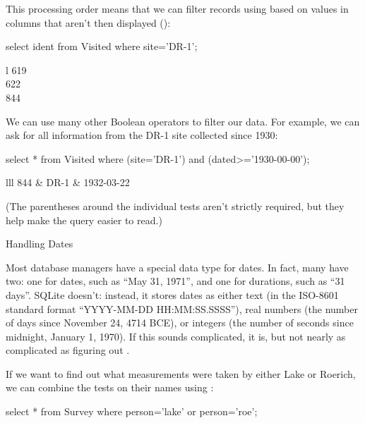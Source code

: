 This processing order means that we can filter records using
 based on values in columns that aren't then displayed
():

\begin{VerbIn}
select ident from Visited where site='DR-1';
\end{VerbIn}

\begin{sqltable}{l}
619 \\
622 \\
844 \\
\end{sqltable}


We can use many other Boolean operators to filter our data. For example,
we can ask for all information from the DR-1 site collected since 1930:

\begin{VerbIn}
select * from Visited where (site='DR-1') and (dated>='1930-00-00');
\end{VerbIn}

\begin{sqltable}{lll}
844 & DR-1 & 1932-03-22 \\
\end{sqltable}

(The parentheses around the individual tests aren't strictly required,
but they help make the query easier to read.)

\begin{swcbox}{Handling Dates}

Most database managers have a special data type for dates. In fact, many
have two: one for dates, such as ``May 31, 1971'', and one for
durations, such as ``31 days''. SQLite doesn't: instead, it stores dates
as either text (in the ISO-8601 standard format ``YYYY-MM-DD
HH:MM:SS.SSSS''), real numbers (the number of days since November 24,
4714 BCE), or integers (the number of seconds since midnight, January 1,
1970). If this sounds complicated, it is, but not nearly as complicated
as figuring out
.

\end{swcbox}

If we want to find out what measurements were taken by either Lake or
Roerich, we can combine the tests on their names using :

\begin{VerbIn}
select * from Survey where person='lake' or person='roe';
\end{VerbIn}

